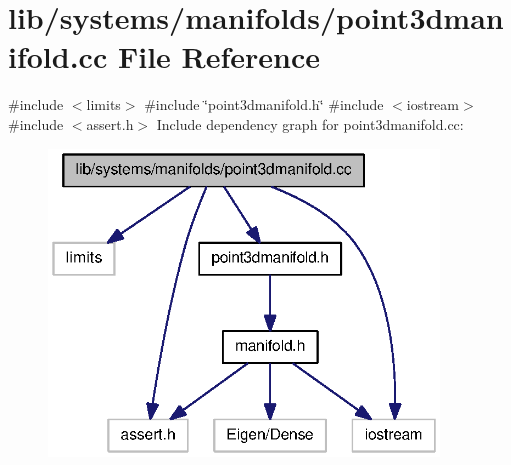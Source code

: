 \section{lib/systems/manifolds/point3dmanifold.cc \-File \-Reference}
\label{point3dmanifold_8cc}
{\ttfamily \#include $<$limits$>$}\*
{\ttfamily \#include \char`\"{}point3dmanifold.\-h\char`\"{}}\*
{\ttfamily \#include $<$iostream$>$}\*
{\ttfamily \#include $<$assert.\-h$>$}\*
\-Include dependency graph for point3dmanifold.\-cc\-:
\nopagebreak
\begin{figure}[H]
\begin{center}
\leavevmode
\includegraphics[width=294pt]{point3dmanifold_8cc__incl}
\end{center}
\end{figure}
